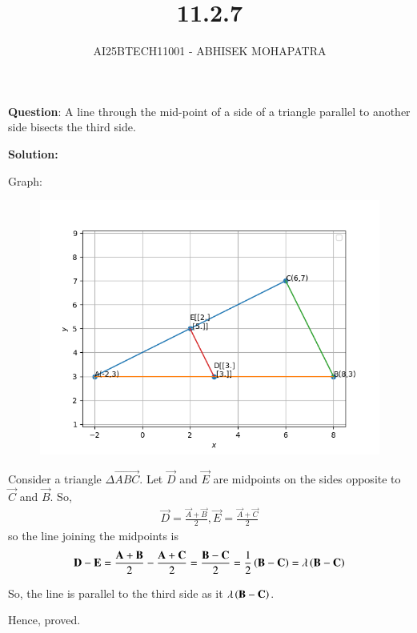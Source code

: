 \documentclass[journal,12pt,onecolumn]{IEEEtran}
\begin{document}
\title{11.2.7}
\author{AI25BTECH11001 - ABHISEK MOHAPATRA}
{\let\newpage\relax\maketitle}
	
	 	\textbf{Question}:
	A line through the mid-point of a side of a triangle parallel to another side bisects
the third side.	

		\textbf{Solution:}

	Graph:
\begin{figure}[h!]
	\centering
	\includegraphics[width=0.55\linewidth]{img.png}
\end{figure}


Consider a triangle $\Delta \vec{ABC}$.
Let $\vec{D}$ and $\vec{E}$ are midpoints on the sides opposite to $\vec{C}$ and $\vec{B}$.
So,
\begin{align}
		\vec{D} = \frac{\vec{A} +\vec{B}}{2}, 
		\vec{E} = \frac{\vec{A} +\vec{C}}{2}
\end{align}
so the line joining the midpoints is
\begin{align}
		\mathbf{D} - \mathbf{E} =\frac{\mathbf{A} +\mathbf{B}}{2}-\frac{\mathbf{A} +\mathbf{C}}{2}
		=\frac{\mathbf{B} -\mathbf{C}}{2}
		=\frac{1}{2}\left(\mathbf{B} -\mathbf{C}\right) = \lambda\left(\mathbf{B} -\mathbf{C}\right)
\end{align}

So, the line is parallel to the third side as it $\lambda\left(\mathbf{B} -\mathbf{C}\right)$.

Hence, proved.
\end{document}

